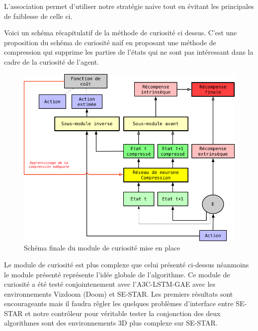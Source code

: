 L'association permet d'utiliser notre stratégie naive tout en évitant les principales de faiblesse de celle ci.

Voici un schéma récapitulatif de la méthode de curiosité ci dessus. C'est une proposition du schéma de curiosité naif en proposant une méthode de compression qui supprime les parties de l'états qui ne sont pas intéressant dans la cadre de la curiosité de l'agent.

\begin{figure}[h!]
    \begin{center}
        \includegraphics[scale=.4]{./assets/CURIOSITY/curiosity2.png}
        \caption{Schéma finale du module de curiosité mise en place}
    \end{center}
\end{figure}

Le module de curiosité est plus complexe que celui présenté ci-dessus néanmoins le module présenté représente l'idée globale de l'algorithme. Ce module de curiosité a été testé conjointenement avec l'A3C-LSTM-GAE avec les environnements Vizdoom (Doom) et SE-STAR. Les premiers résultats sont encourageants mais il faudra rêgler les quelques problèmes d'interface entre SE-STAR et notre contrôleur pour véritable tester la conjonction des deux algorithmes sont des environnements 3D plus complexe sur SE-STAR. 
